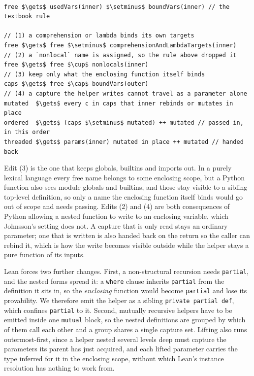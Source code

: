 \documentclass{article}
\newcommand{\code}{\lstinline}
\begin{document}
\begin{lstlisting}[style=pseudo,caption={The free-variable computation, with the four Python-driven edits marked.},label={lst:lift-algo}]

free $\gets$ usedVars(inner) $\setminus$ boundVars(inner) // the textbook rule

// (1) a comprehension or lambda binds its own targets
free $\gets$ free $\setminus$ comprehensionAndLambdaTargets(inner)
// (2) a `nonlocal` name is assigned, so the rule above dropped it
free $\gets$ free $\cup$ nonlocals(inner)
// (3) keep only what the enclosing function itself binds
caps $\gets$ free $\cap$ boundVars(outer)
// (4) a capture the helper writes cannot travel as a parameter alone
mutated  $\gets$ every c in caps that inner rebinds or mutates in place
ordered  $\gets$ (caps $\setminus$ mutated) ++ mutated // passed in, in this order
threaded $\gets$ params(inner) mutated in place ++ mutated // handed back
\end{lstlisting}

Edit (3) is the one that keeps globals, builtins and imports out. In a purely lexical language every free name belongs to some enclosing scope, but a Python function also sees module globals and builtins, and those stay visible to a sibling top-level definition, so only a name the enclosing function itself binds would go out of scope and needs passing. Edits (2) and (4) are both consequences of Python allowing a nested function to write to an enclosing variable, which Johnsson's setting does not. A capture that is only read stays an ordinary parameter; one that is written is also handed back on the return so the caller can rebind it, which is how the write becomes visible outside while the helper stays a pure function of its inputs.

Lean forces two further changes. First, a non-structural recursion needs \code{partial}, and the nested forms spread it: a \code{where} clause inherits \code{partial} from the definition it sits in, so the \emph{enclosing} function would become \code{partial} and lose its provability. We therefore emit the helper as a sibling \code{private partial def}, which confines \code{partial} to it. Second, mutually recursive helpers have to be emitted inside one \code{mutual} block, so the nested definitions are grouped by which of them call each other and a group shares a single capture set. Lifting also runs outermost-first, since a helper nested several levels deep must capture the parameters its parent has just acquired, and each lifted parameter carries the type inferred for it in the enclosing scope, without which Lean's instance resolution has nothing to work from.
\end{document}
